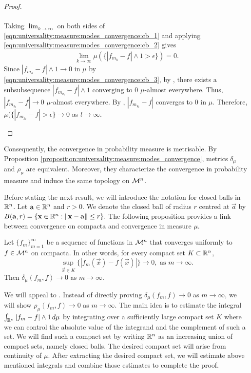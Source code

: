\begin{proof}
\begin{step}[$c \Longrightarrow b$]
\begin{align}
\end{align}
Taking $\lim_{k \to \infty}$ on both sides of \ref{eqn:universality:measure:modes_convergence:cb_1} and applying \ref{eqn:universality:measure:modes_convergence:cb_2} gives
\begin{align}
    \label{eqn:universality:measure:modes_convergence:cb_3}
    \lim_{k \to \infty}   \mu(\{  |f_{m_k} - f| \wedge 1 > \epsilon \}) = 0.
\end{align}
Since $ |f_{m_k} - f| \wedge 1 \to 0$ in $\mu$ by \ref{eqn:universality:measure:modes_convergence:cb_3}, by , there exists a subsubsequence $|f_{m_{k_l}} - f| \wedge 1$ converging to $0$ $\mu$-almost everywhere. Thus, $|f_{m_{k_l}} - f| \to 0$ $\mu$-almost everywhere. By , $|f_{m_{k_l}} - f|$ converges to $0$ in $\mu$. Therefore, $\mu(\{ |f_{m_{k_l}} - f| > \epsilon \} \to 0 $ as $l \to \infty$.
\end{step}
\end{proof}
\begin{remark}
Consequently, the convergence in probability measure is metrisable. By Proposition \ref{proposition:universality:measure:modes_convergence}, metrics $\delta_\mu$ and $\rho_\mu$ are equivalent. Moreover, they characterize the convergence in probability measure and induce the same topology on ${\mathcal M}^n$.
\end{remark}
 Before stating the next result, we will introduce the notation for closed balls in ${\mathbb R}^n$. Let $\mathbf{a} \in {\mathbb R}^n$ and $r > 0$. We denote the closed ball of radius $r$ centred at $\vec{a}$ by $B(\mathbf{a}, r) = \{ \mathbf{x} \in {\mathbb R}^n : \left\lVert\mathbf{x} - \mathbf{a}\right\rVert \leq r \}.$ The following proposition provides a link between convergence on compacta and convergence in measure $\mu$.
\begin{proposition}
\label{proposition:universality:measure:convg_compacta_implies_mu}
Let $\{ f_m \}_{m=1}^\infty$ be a sequence of functions in ${\mathcal M}^n$ that converges uniformly to $f \in {\mathcal M}^n$ on compacta. In other words, for every compact set $K \subset {\mathbb R}^n$, \[ 
    \sup_{\vec{x} \in K} \{ | f_m (\vec{x}) - f(\vec{x}) | \} \to 0, \text{ as $m \to \infty$}.
\]
Then $\delta_\mu(f_m, f) \to 0$ as $m \to \infty$.
\end{proposition}
\begin{proof-idea*}
We will appeal to . Instead of directly proving $\delta_\mu(f_m, f) \to 0$ as $m \to \infty$, 
we will show $\rho_\mu(f_m, f) \to 0$ as $m \to \infty$. The main idea is to estimate the integral $\int_{{\mathbb R}^n} |f_m - f| \wedge 1 \, d\mu$ by integrating over a sufficiently large compact set $K$ where we can control the absolute value of the integrand and the complement of such a set. We will find such a compact set by writing ${\mathbb R}^n$ as an increasing union of compact sets, namely closed balls. The desired compact set will arise from continuity of $\mu$. After extracting the desired compact set, we will estimate above mentioned integrals and combine those estimates to complete the proof.
\end{proof-idea*}
